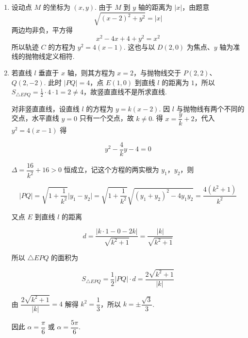 \documentclass[UTF8,a4paper,oneside,11pt]{ctexbook}
\begin{document}
\begin{solution}
\begin{enumerate}
\item 设动点 \(M\) 的坐标为 \((x,y)\). 由于 \(M\) 到 \(y\) 轴的距离为 \(\lvert x\rvert\)，由题意
\[
\sqrt{(x-2)^2+y^2}=\lvert x\rvert
\]
两边均非负，平方得
\[
x^2-4x+4+y^2=x^2
\]
所以轨迹 \(C\) 的方程为 \(y^2=4(x-1)\). 这也与以 \(D(2,0)\) 为焦点、\(y\) 轴为准线的抛物线定义相符.

\item

若直线 \(l\) 垂直于 \(x\) 轴，则其方程为 \(x=2\)，与抛物线交于 \(P(2,2)\)、\(Q(2,-2)\). 此时 \(\lvert PQ\rvert=4\)，点 \(E(1,0)\) 到直线 \(l\) 的距离为 \(1\)，所以 \(S_{\triangle EPQ}=\frac12\cdot4\cdot1=2\ne4\)，故竖直直线不是所求直线.

对非竖直直线，设直线 \(l\) 的方程为 \(y=k(x-2)\). 因 \(l\) 与抛物线有两个不同的交点，水平直线 \(y=0\) 只有一个交点，故 \(k\ne0\). 得 \(x=\dfrac{y}{k}+2\)，代入 \(y^2=4(x-1)\) 得

\[
y^2-\frac{4}{k}y-4=0
\]

\(\Delta=\dfrac{16}{k^2}+16>0\) 恒成立，记这个方程的两实根为 \(y_1\)，\(y_2\)，则

\[
\lvert PQ\rvert=\sqrt{1+\frac{1}{k^2}}\lvert y_1-y_2\rvert=\sqrt{1+\frac{1}{k^2}}\sqrt{(y_1+y_2)^2-4y_1y_2}=\frac{4(k^2+1)}{k^2}
\]

又点 \(E\) 到直线 \(l\) 的距离

\[
d=\frac{\lvert k\cdot1-0-2k\rvert}{\sqrt{k^2+1}}=\frac{\lvert k\rvert}{\sqrt{k^2+1}}
\]

所以 \(\triangle EPQ\) 的面积为

\[
S_{\triangle EPQ}=\frac{1}{2}\lvert PQ\rvert\cdot d=\frac{2\sqrt{k^2+1}}{\lvert k\rvert}
\]

由 \(\dfrac{2\sqrt{k^2+1}}{\lvert k\rvert}=4\) 解得 \(k^2=\dfrac{1}{3}\)，所以 \(k=\pm\dfrac{\sqrt{3}}{3}\).

因此 \(\alpha=\dfrac{\pi}{6}\) 或 \(\alpha=\dfrac{5\pi}{6}\).

\end{enumerate}
\end{solution}
\end{document}
